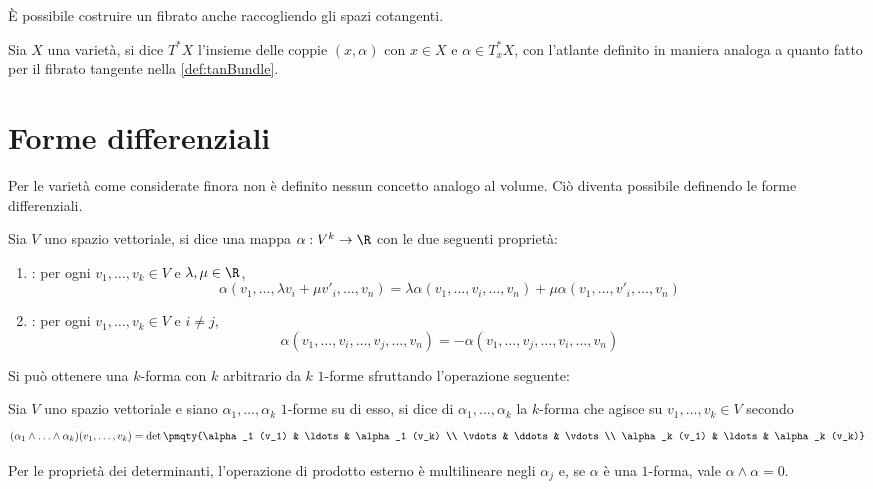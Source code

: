 È possibile costruire un fibrato anche raccogliendo gli spazi cotangenti.

\begin{definition}
  Sia $X$ una varietà, si dice  $T^*X$ l'insieme delle coppie $(x,\alpha)$ con $x \in X$ e $\alpha \in T^*_x X$, con l'atlante definito in maniera analoga a quanto fatto per il fibrato tangente nella \autoref{def:tanBundle}.
\end{definition}

\section{Forme differenziali}
Per le varietà come considerate finora non è definito nessun concetto analogo al volume. Ciò diventa possibile definendo le forme differenziali.

\begin{definition}
  Sia $V$ uno spazio vettoriale, si dice  una mappa $\alpha: V^k \to \R$ con le due seguenti proprietà:
  \begin{enumerate}
    \item {}: per ogni $v_1, \ldots, v_k \in V$ e $\lambda,\mu \in \R$, \begin{equation*}
      \alpha(v_1, \ldots, \lambda v_i + \mu v'_i, \ldots, v_n) = \lambda \alpha(v_1, \ldots, v_i, \ldots, v_n) + \mu \alpha(v_1, \ldots, v'_i, \ldots, v_n)
    \end{equation*} 
    \item {}: per ogni $v_1, \ldots, v_k \in V$ e $i\neq j$, \begin{equation*}
    \alpha(v_1, \ldots, v_i, \ldots, v_j, \ldots, v_n) = 
    - \alpha(v_1, \ldots, v_j, \ldots, v_i, \ldots, v_n)
    \end{equation*} 
  \end{enumerate}
\end{definition}

Si può ottenere una $k$-forma con $k$ arbitrario da $k$ $1$-forme sfruttando l'operazione seguente:
\begin{definition}
  Sia $V$ uno spazio vettoriale e siano $\alpha_1, \ldots, \alpha_k$ $1$-forme su di esso, si dice  di $\alpha_1, \ldots, \alpha_k$ la $k$-forma che agisce su $v_1, \ldots, v_k \in V$ secondo \begin{equation*}
  (\alpha_1 \wedge \ldots \wedge \alpha_k) (v_1, \ldots, v_k) = \det \pmqty{\alpha_1 (v_1) & \ldots & \alpha_1 (v_k) \\
          \vdots & \ddots & \vdots \\
          \alpha_k (v_1) & \ldots & \alpha_k (v_k)}
  \end{equation*} 
\end{definition}
\begin{remark}
  Per le proprietà dei determinanti, l'operazione di prodotto esterno è multilineare negli $\alpha_j$ e, se $\alpha$ è una $1$-forma, vale $\alpha \wedge \alpha = 0$.
\end{remark}

